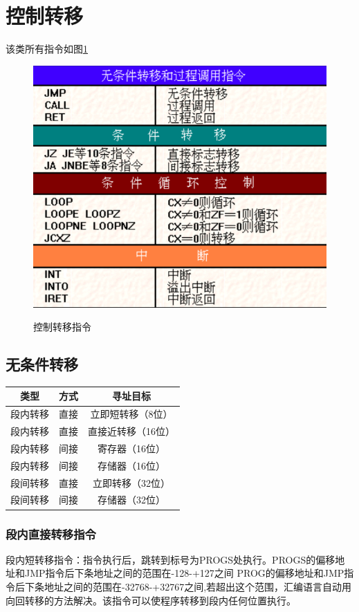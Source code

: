 \section{控制转移}
该类所有指令如图\ref{控制转移指令}
\begin{figure}[H]
    \centering 
    \includegraphics[scale=1]{part_指令系统/part_指令系统_pic/控制转移指令.png}
    \label{控制转移指令}
    \caption{控制转移指令}
\end{figure}
\subsection{无条件转移}
\begin{table}
    \centering
    \begin{tabular}{ccc}
        \hline 
        类型 & 方式 & 寻址目标  \\ \hline
        段内转移 & 直接 & 立即短转移（8位） \\ \hline
        段内转移 &直接& 直接近转移（16位）\\ \hline
        段内转移 & 间接 &寄存器（16位） \\ \hline
        段内转移 & 间接 &存储器（16位）\\ \hline
        段间转移 & 直接 & 立即转移（32位） \\ \hline
        段间转移 & 间接 & 存储器（32位）\\ \hline
    \end{tabular}
\end{table}
\subsubsection{段内直接转移指令}
段内短转移指令：指令执行后，跳转到标号为PROGS处执行。PROGS的偏移地址和JMP指令后下条地址之间的范围在-128-+127之间
PROG的偏移地址和JMP指令后下条地址之间的范围在-32768-+32767之间,若超出这个范围，汇编语言自动用向回转移的方法解决。该指令可以使程序转移到段内任何位置执行。

